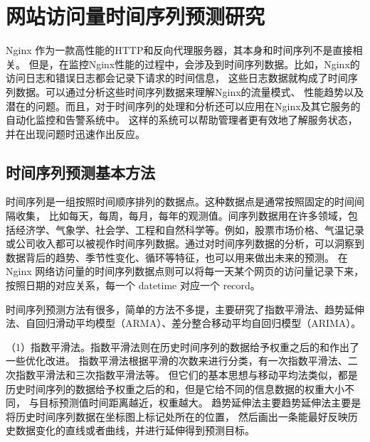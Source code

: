 \chapter{网站访问量时间序列预测研究}

Nginx 作为一款高性能的HTTP和反向代理服务器，其本身和时间序列不是直接相关。
但是，在监控Nginx性能的过程中，会涉及到时间序列数据。比如，Nginx的访问日志和错误日志都会记录下请求的时间信息，
这些日志数据就构成了时间序列数据。可以通过分析这些时间序列数据来理解Nginx的流量模式、
性能趋势以及潜在的问题。而且，对于时间序列的处理和分析还可以应用在Nginx及其它服务的自动化监控和告警系统中。
这样的系统可以帮助管理者更有效地了解服务状态，并在出现问题时迅速作出反应。

\section{时间序列预测基本方法}

时间序列是一组按照时间顺序排列的数据点。这种数据点是通常按照固定的时间间隔收集，
比如每天，每周，每月，每年的观测值。间序列数据用在许多领域，包括经济学、气象学、社会学、工程和自然科学等。例如，股票市场价格、气温记录或公司收入都可以被视作时间序列数据。通过对时间序列数据的分析，可以洞察到数据背后的趋势、季节性变化、循环等特征，也可以用来做出未来的预测。
在 Nginx 网络访问量的时间序列数据点则可以将每一天某个网页的访问量记录下来，按照日期的对应关系，每一个 datetime 对应一个 record。

时间序列预测方法有很多，简单的方法不多提，主要研究了指数平滑法、趋势延伸法、自回归滑动平均模型（ARMA）、差分整合移动平均自回归模型（ARIMA）。

（1）指数平滑法。指数平滑法则在历史时间序列的数据给予权重之后的和作出了一些优化改进。
指数平滑法根据平滑的次数来进行分类，有一次指数平滑法、二次指数平滑法和三次指数平滑法等。
但它们的基本思想与移动平均法类似，都是历史时间序列的数据给予权重之后的和，但是它给不同的信息数据的权重大小不同，
与目标预测值时间距离越近，权重越大。
趋势延伸法主要趋势延伸法主要是将历史时间序列数据在坐标图上标记处所在的位置，
然后画出一条能最好反映历史数据变化的直线或者曲线，并进行延伸得到预测目标。

